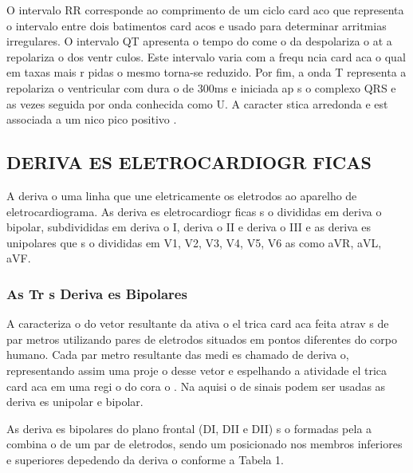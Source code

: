 \documentclass{article}
\begin{document}
O intervalo RR corresponde ao comprimento de um ciclo card aco que representa o intervalo entre dois batimentos card acos e   usado para determinar arritmias irregulares. O intervalo QT apresenta o tempo do come o da despolariza o at  a repolariza o dos ventr culos. Este intervalo varia com a frequ ncia card aca o qual em taxas mais r pidas o mesmo torna-se reduzido. Por fim, a onda T representa a repolariza o ventricular com dura o de 300ms e   iniciada ap s o complexo QRS e as vezes   seguida por onda conhecida como U. A caracter stica   arredonda e est  associada a um  nico pico positivo \cite{sornmo}.


\subsection{DERIVA ES ELETROCARDIOGR FICAS}
\hspace*{0.8cm} A deriva o   uma linha que une eletricamente os eletrodos ao aparelho de eletrocardiograma. As deriva es eletrocardiogr ficas s o divididas em deriva o bipolar, subdivididas em deriva o I, deriva o II e deriva o III e as deriva es unipolares que s o divididas em V1, V2, V3, V4, V5, V6 as como aVR, aVL, aVF.

\subsubsection{As Tr s Deriva es Bipolares}

\hspace*{0.8cm}A caracteriza o do vetor resultante da ativa o el trica card aca   feita atrav s de par metros utilizando pares de eletrodos situados em pontos diferentes do corpo humano. Cada par metro resultante das medi es   chamado de deriva o, representando assim uma proje o desse vetor e espelhando a atividade el trica card aca em uma regi o do cora o \cite{webster}. Na aquisi o de sinais podem ser usadas as deriva es unipolar e bipolar.

As deriva es bipolares do plano frontal (DI, DII e DII) s o formadas pela a combina o de um par de eletrodos, sendo um posicionado nos membros inferiores e superiores depedendo da deriva o conforme a Tabela 1.
\end{document}
